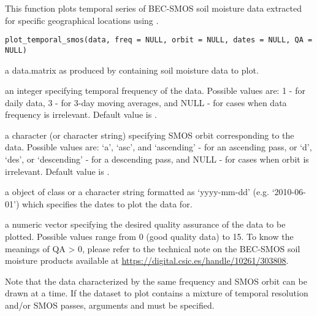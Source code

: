 \documentclass[a4paper]{book}
\begin{document}
%
\begin{Description}
This function plots temporal series of BEC-SMOS soil moisture data
extracted for specific geographical locations using .
\end{Description}
%
\begin{Usage}
\begin{verbatim}
plot_temporal_smos(data, freq = NULL, orbit = NULL, dates = NULL, QA = NULL)
\end{verbatim}
\end{Usage}
%
\begin{Arguments}
\begin{ldescription}
\item[\code{data}] a data.matrix as produced by  containing soil
moisture data to plot.

\item[\code{freq}] an integer specifying temporal frequency of the data. Possible
values are: 1 - for daily data, 3 - for 3-day moving averages, and NULL -
for cases when data frequency is irrelevant. Default value is .

\item[\code{orbit}] a character (or character string) specifying SMOS orbit
corresponding to the data. Possible values are: ‘a’, ‘asc’, and ‘ascending’ -
for an ascending pass, or ‘d’, ‘des’, or ‘descending’ - for a descending
pass, and NULL - for cases when orbit is irrelevant. Default value is
.

\item[\code{dates}] a object of class  or a character string formatted
as ‘yyyy-mm-dd’ (e.g. ‘2010-06-01’) which specifies the dates to plot the
data for.

\item[\code{QA}] a numeric vector specifying the desired quality assurance of the
data to be plotted. Possible values range from 0 (good quality data) to 15.
To know the meanings of QA > 0, please refer to the technical note on the
BEC-SMOS soil moisture products available at
\url{https://digital.csic.es/handle/10261/303808}.
\end{ldescription}
\end{Arguments}
%
\begin{Details}
Note that the data characterized by the same frequency and SMOS orbit can
be drawn at a time. If the dataset to plot contains a mixture of temporal
resolution and/or SMOS passes, arguments  and 
must be specified.
\end{Details}
\end{document}
